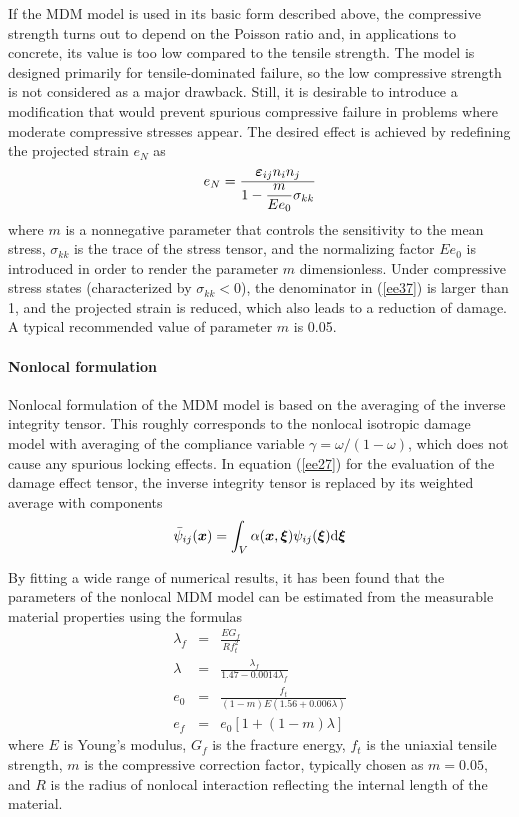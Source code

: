 \documentclass[a4paper]{article}
\newcommand{\mbf}[1]{\mbox{\boldmath$#1$}}
\newcommand{\eps} {\mbf{\varepsilon}}
\newcommand{\vxi}{\mbf{\xi}}%
\newcommand{\vx}{\mbf{x}}%
\begin{document}
If the MDM model is used in its basic form described above,
the compressive strength turns out to depend on the Poisson ratio and,
in applications to concrete, its value is too low compared to the
tensile strength. The model is designed primarily for tensile-dominated
failure, so the low compressive strength
is not considered as a major drawback. Still, it
is desirable to introduce a modification that would prevent spurious
compressive failure in problems where moderate compressive stresses
appear. The desired effect is achieved by redefining the projected
strain $e_N$ as
\begin{equation}
\label{ee37}
e_N =  \frac{\eps_{ij}n_in_j}{1-\displaystyle\frac{m}{Ee_0}\sigma_{kk}}
\end{equation}
where $m$ is a nonnegative parameter that controls the sensitivity to the
mean stress, $\sigma_{kk}$ is the trace of the stress tensor,
and the normalizing factor
$Ee_0$ is introduced in order to render the parameter
$m$ dimensionless.
Under compressive stress states (characterized by $\sigma_{kk}<0$),
the denominator in (\ref{ee37}) is larger than 1, and the projected strain
is reduced, which also leads to a reduction of damage.
A typical recommended value of parameter $m$ is 0.05.

\paragraph{Nonlocal formulation}

Nonlocal formulation of the MDM model is based on the averaging of
the inverse integrity tensor. This roughly corresponds to the nonlocal
isotropic damage model with averaging of the compliance variable
$\gamma=\omega/(1-\omega)$, which does not cause any spurious locking effects.
In equation (\ref{ee27}) for the evaluation of the damage effect tensor,
the inverse integrity tensor is replaced by its weighted average with
components
\begin{equation}
\label{psinl1}
\bar{\psi}_{ij}(\vx)=\int_V \alpha(\vx,\vxi)\psi_{ij}(\vxi)\mbox{d}\vxi
\end{equation}

By fitting a wide range of numerical results, it has been found that
the parameters of the nonlocal MDM model can be estimated from the
measurable material properties using the formulas
\begin{eqnarray}
\lambda_f&=&\frac{EG_f}{Rf_t^2}
\\
\lambda&=&\frac{\lambda_f}{1.47-0.0014\lambda_f}
\\
e_0&=&\frac{f_t}{(1-m)E(1.56+0.006\lambda)}
\\
e_f&=&e_0[1+(1-m)\lambda]
\end{eqnarray}
where $E$ is Young's modulus, $G_f$ is the fracture energy, $f_t$
is the uniaxial tensile strength,
$m$ is the compressive correction factor, typically chosen
as $m=0.05$, and $R$ is the radius of nonlocal interaction reflecting the
internal length of the material.
\end{document}
